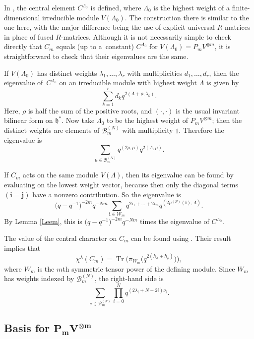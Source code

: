 \documentclass[pdftex]{sigma}
\numberwithin{equation}{section}
\newcommand{\ii}{{\mathbf{i}}}
\newcommand{\jj}{{\mathbf{j}}}
\begin{document}
\begin{Remark}\label{Remark1}
In \cite{ZGBJPhysA}, the central element $C^{\Lambda_0}$ is defined, where $\Lambda_0$ is the highest weight of a finite-dimensional irreducible module $V(\Lambda_0)$. The construction there is similar to the one here, with the major difference being the use of explicit universal $R$-matrices in place of fused $R$-matrices. Although it is not necessarily simple to check directly that $C_m$ equals (up to a~constant) $C^{\Lambda_0}$ for $V(\Lambda_0)=P_mV^{\otimes m}$, it is straightforward to check that their eigenvalues are the same.

If $V(\Lambda_0)$ has distinct weights $\lambda_1,\dots,\lambda_r$ with multiplicities $d_1,\dots,d_r$, then the eigenvalue of~$C^{\Lambda_0}$ on an irreducible module with highest weight $\Lambda$ is given by
\[
\sum_{k=1}^r d_k q^{2(\Lambda + \rho,\lambda_k)}.
\]
Here, $\rho$ is half the sum of the positive roots, and $(\cdot,\cdot)$ is the usual invariant bilinear form on $\mathfrak{h}^*$. Now take $\Lambda_0$ to be the highest weight of $P_mV^{\otimes m}$; then the distinct weights are elements of $\mathcal{B}^{(N)}_m$ with multiplicity $1$. Therefore the eigenvalue is
\[
\sum_{\mu \in \mathcal{B}^{(N)}_m} q^{(2\rho,\mu)}q^{2(\Lambda,\mu)}.
\]

If $C_m$ acts on the same module $V(\Lambda)$, then its eigenvalue can be found by evaluating on the lowest weight vector, because then only the diagonal terms $(\ii=\jj)$ have a nonzero contribution. So the eigenvalue is
\[
\big(q-q^{-1}\big)^{-2m}q^{-Nm}\sum_{\ii \in \mathcal{W}_m} q^{ 2i_1 + \dots + 2i_m} q^{(2\mu^{(N)}(\ii),\Lambda)}.
\]
By Lemma \ref{Leem}, this is $\big(q-q^{-1}\big)^{-2m}q^{-Nm}$ times the eigenvalue of $C^{\Lambda_0}$.
\end{Remark}

\begin{Remark}
 The value of the central character on $C_m$ can be found using
\cite[Corollary~A.2]{mudrov2007quantum}. Their result implies that
\[
\chi^{\lambda}(C_m) = \operatorname{Tr}\big(\pi_{W_m}\big(q^{2(h_{\lambda}+h_{\rho})}\big)\big),
\]
where $W_m$ is the $m$th symmetric tensor power of the defining module. Since $W_m$ has weights indexed by $\mathcal{B}_m^{(N)}$, the right-hand side is
\[
\sum_{\nu \in \mathcal{B}_m^{(N)}} \prod_{i=0}^Nq^{ (2\lambda_i + N-2i)\nu_i }.
\]
\end{Remark}

\subsection[Basis for P\_mV\^\{otimes m\}]{Basis for $\boldsymbol{P_mV^{\otimes m}}$}
\end{document}
